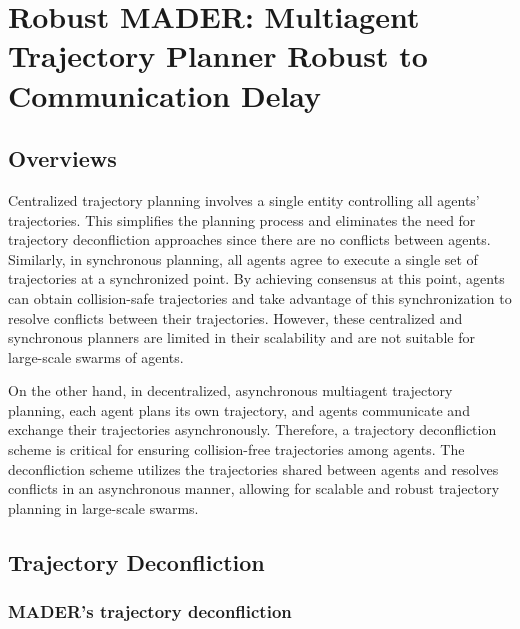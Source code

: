 \chapter{Robust MADER: Multiagent Trajectory Planner Robust to Communication Delay}\label{chap:rmader}

\section{Overviews}\label{sec:td-overviews}

Centralized trajectory planning involves a single entity controlling all agents' trajectories. This simplifies the planning process and eliminates the need for trajectory deconfliction approaches since there are no conflicts between agents. Similarly, in synchronous planning, all agents agree to execute a single set of trajectories at a synchronized point. By achieving consensus at this point, agents can obtain collision-safe trajectories and take advantage of this synchronization to resolve conflicts between their trajectories. However, these centralized and synchronous planners are limited in their scalability and are not suitable for large-scale swarms of agents.

On the other hand, in decentralized, asynchronous multiagent trajectory planning, each agent plans its own trajectory, and agents communicate and exchange their trajectories asynchronously. Therefore, a trajectory deconfliction scheme is critical for ensuring collision-free trajectories among agents. The deconfliction scheme utilizes the trajectories shared between agents and resolves conflicts in an asynchronous manner, allowing for scalable and robust trajectory planning in large-scale swarms. 

\section{Trajectory Deconfliction}

\subsection{MADER's trajectory deconfliction}

